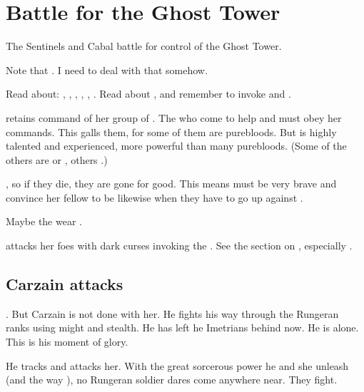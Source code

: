 \chapter{Battle for the Ghost Tower}
The Sentinels and Cabal battle for control of the Ghost Tower. 

Note that . 
I need to deal with that somehow. 

Read about: 
  ,
  ,
  ,
  ,
  ,
  . 
Read about , and remember to invoke \Sethicus and \Tiamat. 

\Achsah retains command of her group of \resphain. 
The \resphain who come to help \Achsah {} and must obey her commands. 
This galls them, for some of them are purebloods. 
But \Achsah is highly talented and experienced, more powerful than many purebloods.
(Some of the others are \thelyadeth or \gessurim, others \bezedeth.)

, so if they die, they are gone for good. 
This means \Achsah must be very brave and convince her fellow \bezedeth to be likewise when they have to go up against \Nzessuacrith.
    
Maybe the \resphain wear .

\Nzessuacrith attacks her foes with dark curses invoking the \xss. 
See the section on , especially .





\section{Carzain attacks \Takestsha}
\Takestsha {}. 
But Carzain is not done with her.
He fights his way through the Rungeran ranks using might and stealth.
He has left he Imetrians behind now. 
He is alone. 
This is his moment of glory. 

He tracks \Takestsha and attacks her. 
With the great sorcerous power he and she unleash (and the way ), no Rungeran soldier dares come anywhere near. 
They fight. 

